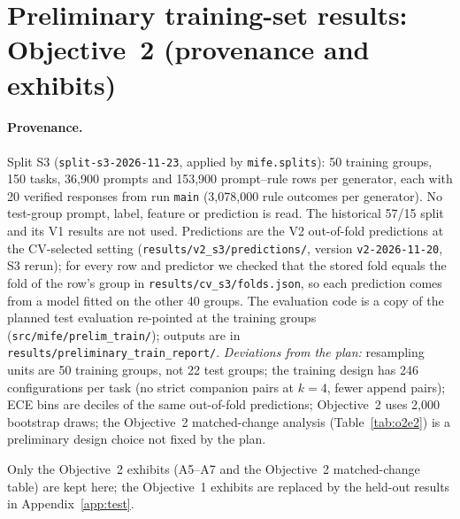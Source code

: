 \documentclass{article}
\begin{document}
\section{Preliminary training-set results: Objective~2 (provenance and exhibits)}
\label{app:prelim}

\paragraph{Provenance.} Split S3 (\texttt{split-s3-2026-11-23}, applied by \texttt{mife.splits}): 50 training groups,
150 tasks, 36,900 prompts and 153,900 prompt--rule rows per generator, each with 20 verified responses from run
\texttt{main} (3,078,000 rule outcomes per generator). No test-group prompt, label, feature or prediction is read. The
historical 57/15 split and its V1 results are not used. Predictions are the V2 out-of-fold predictions at the
CV-selected setting (\texttt{results/v2\_s3/predictions/}, version \texttt{v2-2026-11-20}, S3 rerun); for every row and
predictor we checked that the stored fold equals the fold of the row's group in \texttt{results/cv\_s3/folds.json}, so
each prediction comes from a model fitted on the other 40 groups. The evaluation code is a copy of the planned test
evaluation re-pointed at the training groups (\texttt{src/mife/prelim\_train/}); outputs are in
\texttt{results/preliminary\_train\_report/}. \emph{Deviations from the plan:} resampling units are 50 training groups,
not 22 test groups; the training design has 246 configurations per task (no strict companion pairs at $k=4$, fewer
append pairs); ECE bins are deciles of the same out-of-fold predictions; Objective~2 uses 2,000 bootstrap draws; the
Objective~2 matched-change analysis (Table~\ref{tab:o2e2}) is a preliminary design choice not fixed by the plan.


Only the Objective~2 exhibits (A5--A7 and the Objective~2 matched-change table) are kept here; the Objective~1 exhibits are replaced by the held-out results in Appendix~\ref{app:test}.
\end{document}
